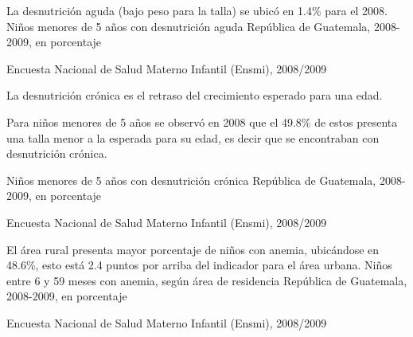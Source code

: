 %
{%
	La desnutrición aguda (bajo peso para la talla) se ubicó en 1.4\% para el 2008.
}%
{%
	Niños menores de 5 años con desnutrición aguda} %
{%
	República de Guatemala, 2008-2009, en porcentaje} %
{%
	\begin{tikzpicture}[x=1pt,y=1pt]    \end{tikzpicture}}%
{%
	Encuesta Nacional de Salud Materno Infantil (Ensmi), 2008/2009} %



%
{%
	La desnutrición crónica es el retraso del crecimiento esperado para una edad. 
	
	Para niños menores de 5 años se observó en 2008 que el 49.8\% de estos presenta una talla menor a la esperada para su edad, es decir que se encontraban con desnutrición crónica. 
}%
{%
	Niños menores de 5 años con desnutrición crónica} %
{%
	República de Guatemala, 2008-2009, en porcentaje} %
{%
	\begin{tikzpicture}[x=1pt,y=1pt]    \end{tikzpicture}}%
{%
	Encuesta Nacional de Salud Materno Infantil (Ensmi), 2008/2009} %



%
{%
	El área rural presenta mayor porcentaje de niños con anemia, ubicándose en 48.6\%, esto está 2.4 puntos por arriba del indicador para el área urbana. 
	}%
{%
	Niños entre 6 y 59 meses con anemia, según área de residencia} %
{%
	República de Guatemala, 2008-2009, en porcentaje} %
{%
	\begin{tikzpicture}[x=1pt,y=1pt]    \end{tikzpicture}}%
{%
	Encuesta Nacional de Salud Materno Infantil (Ensmi), 2008/2009} %


